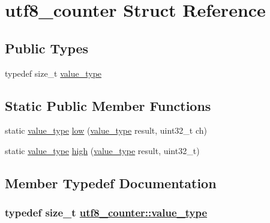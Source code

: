 \hypertarget{structutf8__counter}{
\section{utf8\_\-counter Struct Reference}
\label{structutf8__counter}
}
\subsection*{Public Types}
\begin{CompactItemize}
\item 
typedef size\_\-t \hyperlink{structutf8__counter_db65152c007965c42184614da9c4af1b}{value\_\-type}
\end{CompactItemize}
\subsection*{Static Public Member Functions}
\begin{CompactItemize}
\item 
static \hyperlink{structutf8__counter_db65152c007965c42184614da9c4af1b}{value\_\-type} \hyperlink{structutf8__counter_0950643189089175ae0eac9b4193534d}{low} (\hyperlink{structutf8__counter_db65152c007965c42184614da9c4af1b}{value\_\-type} result, uint32\_\-t ch)
\item 
static \hyperlink{structutf8__counter_db65152c007965c42184614da9c4af1b}{value\_\-type} \hyperlink{structutf8__counter_b16e675980a15e1ede2e4cd18d19f7b1}{high} (\hyperlink{structutf8__counter_db65152c007965c42184614da9c4af1b}{value\_\-type} result, uint32\_\-t)
\end{CompactItemize}


\subsection{Member Typedef Documentation}
\hypertarget{structutf8__counter_db65152c007965c42184614da9c4af1b}{
\subsubsection[value\_\-type]{\setlength{\rightskip}{0pt plus 5cm}typedef size\_\-t \hyperlink{structutf8__counter_db65152c007965c42184614da9c4af1b}{utf8\_\-counter::value\_\-type}}}
\label{structutf8__counter_db65152c007965c42184614da9c4af1b}




